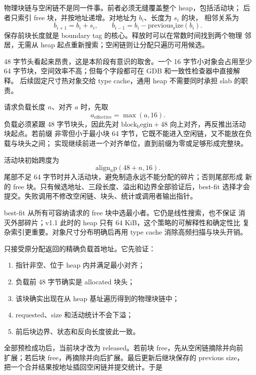 物理块链与空闲链不是同一件事。前者必须无缝覆盖整个 heap，包括活动块；
后者只索引 free 块，并按地址递增。对地址为 \(b_i\)、长度为 \(s_i\) 的块，
相邻关系为
\[
  b_{i+1}=b_i+s_i,\qquad
  b_{i-1}=b_i-\operatorname{previous_size}(b_i).
\]
保存前块长度就是 boundary tag 的核心。释放时可以在常数时间找到两个物理
邻居，无需从 heap 起点重新搜索；空闲链则让分配只遍历可用候选。

48 字节头看起来昂贵，这是本阶段有意识的取舍。一个 16 字节小对象会占用至少
64 字节块，空间效率不高；但每个字段都可在 GDB 和一致性检查器中直接解释。
后续固定尺寸热对象交给 type cache，通用 heap 不需要同时承担 slab 的职责。

请求负载长度 \(n\)、对齐 \(a\) 时，先取
\[
  a_{\mathrm{effective}}=\max(a,16).
\]
负载必须紧跟 48 字节块头，因此先对
\(\operatorname{block_begin}+48\) 向上对齐，再反推出活动块起点。若前缀
非零但小于最小块 64 字节，它既不能进入空闲链，又不能放在负载与块头之间；
实现继续前进一个对齐单位，直到前缀为零或足够形成完整块。

活动块初始跨度为
\[
  \operatorname{align_up}(48+n,16).
\]
尾部不足 64 字节时并入活动块，避免制造永远不能分配的碎片；否则尾部形成
新的 free 块。只有候选地址、三段长度、溢出和边界全部验证后，best-fit
选择才会提交。失败调用不修改空闲链、块头、统计或调用者输出指针。

best-fit 从所有可容纳请求的 free 块中选最小者。它仍是线性搜索，也不保证
消灭外部碎片；v1.1 此时的 heap 只有 64 KiB，这个策略的可解释性和确定性比
复杂索引更重要。对象尺寸分布明确后再用 type cache 消除高频扫描与块头开销。

 只接受原分配返回的精确负载首地址。它先验证：

\begin{enumerate}[label=\arabic*.]
  \item 指针非空、位于 heap 内并满足最小对齐；
  \item 负载前 48 字节确实是 allocated 块头；
  \item 该块确实出现在从 heap 基址遍历得到的物理块链中；
  \item requested、size 和活动统计不会下溢；
  \item 前后块边界、状态和反向长度彼此一致。
\end{enumerate}

全部预检成功后，当前块才改为 released。若前块 free，先从空闲链摘除并向前
扩展；若后块 free，再摘除并向后扩展。最后更新后继块保存的 previous size，
把一个合并结果按地址插回空闲链并提交统计。于是


